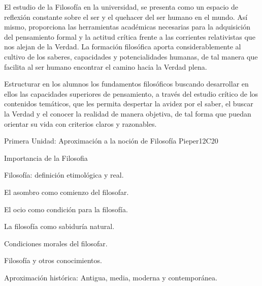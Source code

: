 \begin{syllabus}


\begin{justification}
El estudio de la Filosofía en la universidad, se presenta como un espacio de reflexión constante sobre el ser y el quehacer del ser humano en el mundo. Así mismo, proporciona las herramientas académicas necesarias para la adquisición del pensamiento formal y la actitud crítica frente a las corrientes relativistas que nos alejan de la Verdad.
La formación filosófica aporta considerablemente al cultivo de los saberes, capacidades y potencialidades humanas, de tal manera que facilita al ser humano encontrar el camino hacia la Verdad plena.
\end{justification}

\begin{goals}
\item Estructurar en los alumnos los fundamentos filosóficos buscando desarrollar en ellos las capacidades superiores de pensamiento, a través del estudio crítico de los contenidos temáticos, que les permita despertar la avidez por el saber, el buscar la Verdad y el conocer la realidad de manera objetiva, de tal forma que puedan orientar su vida con criterios claros y razonables.
\end{goals}

\begin{outcomes}
    \item {}
    \item {}
    \item {}
\end{outcomes}

\begin{competences}
    \item {}
    \item {}
\end{competences}

\begin{unit}{}{Primera Unidad: Aproximación a la noción de Filosofía }{Pieper}{12}{C20}
\begin{topics}
	\item Importancia de la Filosofia
	\item Filosofía: definición etimológica y real.
	\item El asombro como comienzo del filosofar.
	\item El ocio como condición para la filosofía.
    \item La filosofía como sabiduría natural.
    \item Condiciones morales del filosofar.
    \item Filosofía y otros conocimientos.
    \item Aproximación histórica: Antigua, media, moderna y contemporánea.
\end{topics}


\end{unit}
\end{syllabus}
